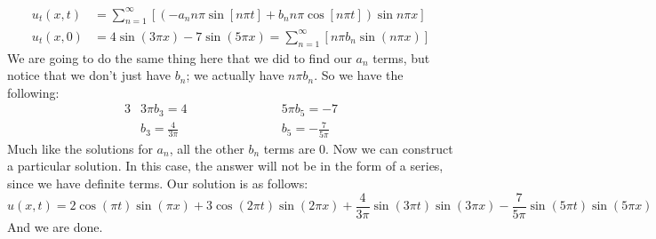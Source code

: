 \documentclass{article}
\begin{document}
\begin{align*}
u_{t}(x,t) &= \sum_{n=1}^{\infty}\left[(-a_{n}n\pi\sin{[n\pi t]} + b_{n}n\pi\cos{[n\pi t]})\sin{n\pi x}\right]\\
u_{t}(x,0) &= 4\sin{(3\pi x)} - 7\sin{(5\pi x)} = \sum_{n=1}^{\infty}\left[n\pi b_{n}\sin{(n\pi x)}\right]
\end{align*}
\noindent We are going to do the same thing here that we did to find our $a_{n}$ terms, but notice that we don't just have $b_{n}$; we actually have $n\pi b_{n}$. So we have the following:
\begin{alignat*}{3}
&3\pi b_{3} = 4 \qquad \qquad \qquad &&5\pi b_{5} = -7\\
&b_{3} = \frac{4}{3\pi} &&b_{5} = -\frac{7}{5\pi}
\end{alignat*}
\noindent Much like the solutions for $a_{n}$, all the other $b_{n}$ terms are 0. Now we can construct a particular solution. In this case, the answer will not be in the form of a series, since we have definite terms. Our solution is as follows:
\[
u(x,t) = 2\cos{(\pi t)}\sin{(\pi x)} + 3\cos{(2\pi t)}\sin{(2\pi x)} + \frac{4}{3\pi}\sin{(3\pi t)}\sin{(3\pi x)} - \frac{7}{5\pi}\sin{(5\pi t)}\sin{(5\pi x)}
\]
\noindent And we are done.
\newpage
\end{document}
